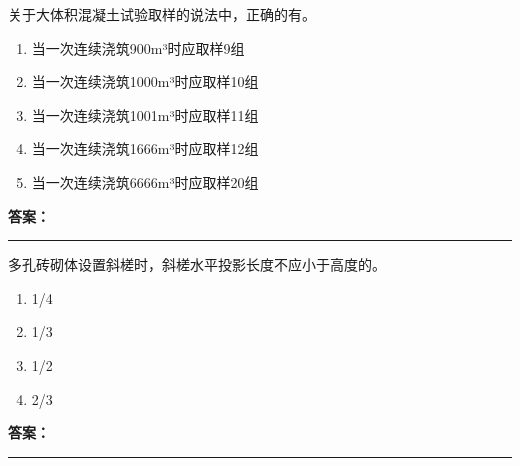 \documentclass[UTF8,fontset=fandol,11pt]{ctexart}
\newcommand{\answerline}{\textcolor{answerred}{\rule{2.4cm}{0.7pt}}}
\begin{document}
\begin{quizbox}[title={乱序第 170 题｜第四章混凝土结构工程}]

关于大体积混凝土试验取样的说法中，正确的有。\\

\begin{enumerate}[label=\Alph*.]

\item 当一次连续浇筑900m³时应取样9组

\item 当一次连续浇筑1000m³时应取样10组

\item 当一次连续浇筑1001m³时应取样11组

\item 当一次连续浇筑1666m³时应取样12组

\item 当一次连续浇筑6666m³时应取样20组

\end{enumerate}

\textbf{\textcolor{answerred}{答案：}} \answerline

\end{quizbox}

\vspace{0.2em}

\begin{quizbox}[title={乱序第 171 题｜第六章砌筑工程}]

多孔砖砌体设置斜槎时，斜槎水平投影长度不应小于高度的。\\

\begin{enumerate}[label=\Alph*.]

\item 1/4

\item 1/3

\item 1/2

\item 2/3

\end{enumerate}

\textbf{\textcolor{answerred}{答案：}} \answerline

\end{quizbox}

\vspace{0.2em}
\end{document}
